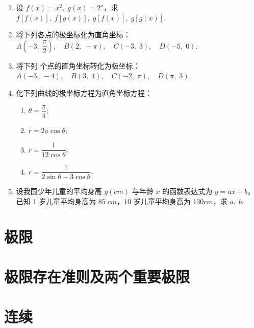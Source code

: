 \begin{enumerate}
    \item 设 $f(x)=x^2,\;g(x)=2^x$，求 $f[f(x)],\;f[g(x)],\;g[f(x)],\;g[g(x)]$.
    
    \item 将下列各点的极坐标化为直角坐标：\\
    $A\left(-3,\;\dfrac{\pi}{2}\right),\quad B(2,\;-\pi),\quad C(-3,\;3),\quad D(-5,\;0)$.

    \item 将下列 个点的直角坐标转化为极坐标：\\
    $A(-3,\;-4),\quad B(3,\;4),\quad C(-2,\;\pi),\quad D(\pi,\;3)$.

    \item 化下列曲线的极坐标方程为直角坐标方程：
    \begin{enumerate}[(1)]\setlength{\itemsep}{5pt}\setlength{\topsep}{15pt}
        \item $\theta=\dfrac{\pi}{4}$;
        \item $r=2a\cos\theta$;
        \item $r=\dfrac{1}{12\cos \theta}$;
        \item $r=\dfrac{1}{2\sin\theta-3\cos\theta}$.
    \end{enumerate}    

    \item 设我国少年儿童的平均身高 $y(cm)$ 与年龄 $x$ 的函数表达式为 $y=ax+b$，已知 $1$ 岁儿童平均身高为 $85\;cm$，$10$ 岁儿童平均身高为 $130cm$，求 $a,\;b$.


\end{enumerate}


\section{极限}


\section{极限存在准则及两个重要极限}


\section{连续}